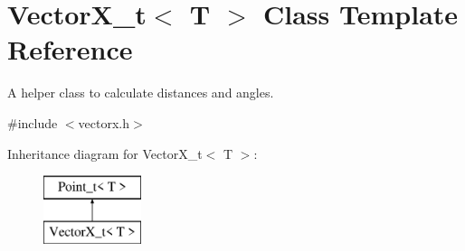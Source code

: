 \hypertarget{class_vector_x__t}{}\section{Vector\+X\+\_\+t$<$ T $>$ Class Template Reference}
\label{class_vector_x__t}


A helper class to calculate distances and angles.  




{\ttfamily \#include $<$vectorx.\+h$>$}

Inheritance diagram for Vector\+X\+\_\+t$<$ T $>$\+:\begin{figure}[H]
\begin{center}
\leavevmode
\includegraphics[height=2.000000cm]{class_vector_x__t}
\end{center}
\end{figure}
